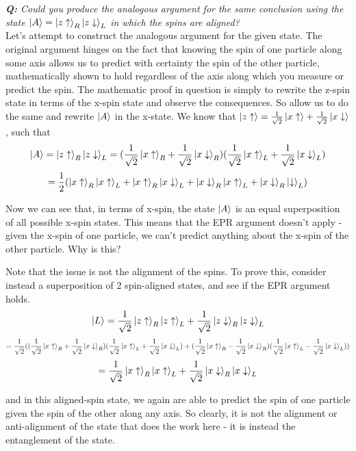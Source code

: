 \emph{\textbf{Q:} Could you produce the analogous argument for the same
      conclusion using the state
      $\ket{A} = \ket{z\uparrow}_R\ket{z\downarrow}_L$ in which the spins
      are aligned?}
\hfill \\

Let's attempt to construct the analogous argument for the given state. The
original argument hinges on the fact that knowing the spin of one particle
along some axis allows us to predict with certainty the spin of the other
particle, mathematically shown to hold regardless of the axis along which you
measure or predict the spin. The mathematic proof in question is simply to 
rewrite the z-spin state in terms of the x-spin state and observe the
consequences. So allow us to do the same and rewrite $\ket{A}$ in the x-state.
We know that $\ket{z\uparrow} = \frac{1}{\sqrt{2}}\ket{x\uparrow}+
\frac{1}{\sqrt{2}}\ket{x\downarrow}$, such that
\[\ket{A} = \ket{z\uparrow}_R\ket{z\downarrow}_L = (\frac{1}{\sqrt{2}}
\ket{x\uparrow}_R+\frac{1}{\sqrt{2}}\ket{x\downarrow}_R)(\frac{1}{\sqrt{2}}
\ket{x\uparrow}_L+\frac{1}{\sqrt{2}}\ket{x\downarrow}_L)\]
\[= \frac{1}{2}(\ket{x\uparrow}_R\ket{x\uparrow}_L +
    \ket{x\uparrow}_R\ket{x\downarrow}_L +
    \ket{x\downarrow}_R\ket{x\uparrow}_L +
    \ket{x\downarrow}_R\ket{\downarrow}_L)\]

Now we can see that, in terms of x-spin, the state $\ket{A}$ is an equal
superposition of all possible x-spin states. This means that the EPR argument
doesn't apply - given the x-spin of one particle, we can't predict anything
about the x-spin of the other particle. Why is this?

Note that the issue is not the alignment of the spins. To prove this,
consider instead a superposition of 2 spin-aligned states, and see if the EPR
argument holds.
\[\ket{L} = \frac{1}{\sqrt{2}}\ket{z\uparrow}_R\ket{z\uparrow}_L
          + \frac{1}{\sqrt{2}}\ket{z\downarrow}_R\ket{z\downarrow}_L\]
\[=\frac{1}{\sqrt{2}}(
  (\frac{1}{\sqrt{2}}\ket{x\uparrow}_R+\frac{1}{\sqrt{2}}\ket{x\downarrow}_R)
  (\frac{1}{\sqrt{2}}\ket{x\uparrow}_L+\frac{1}{\sqrt{2}}\ket{x\downarrow}_L) +
  (\frac{1}{\sqrt{2}}\ket{x\uparrow}_R-\frac{1}{\sqrt{2}}\ket{x\downarrow}_R)
  (\frac{1}{\sqrt{2}}\ket{x\uparrow}_L-\frac{1}{\sqrt{2}}\ket{x\downarrow}_L))\]
\[=\frac{1}{\sqrt{2}}\ket{x\uparrow}_R\ket{x\uparrow}_L +
   \frac{1}{\sqrt{2}}\ket{x\downarrow}_R\ket{x\downarrow}_L\]

and in this aligned-spin state, we again are able to predict the spin of one
particle given the spin of the other along any axis. So clearly, it is not
the alignment or anti-alignment of the state that does the work here - it is
instead the entanglement of the state.


